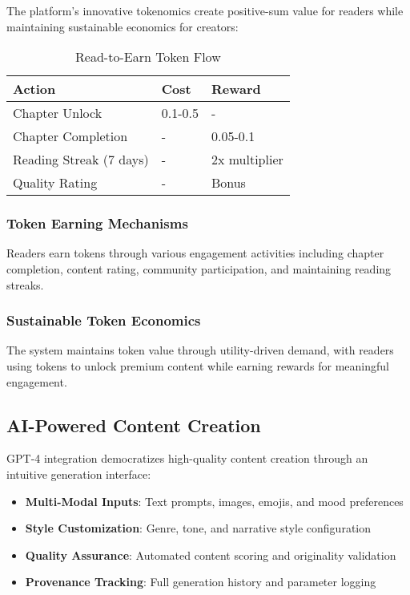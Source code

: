 The platform's innovative tokenomics create positive-sum value for readers while maintaining sustainable economics for creators:

\begin{table}[H]
\centering
\caption{Read-to-Earn Token Flow}
\label{tab:read-to-earn-flow}
\begin{tabular}{@{}lll@{}}
\toprule
\textbf{Action} & \textbf{Cost} & \textbf{Reward} \\
\midrule
Chapter Unlock & 0.1-0.5 \tip{} & - \\
Chapter Completion & - & 0.05-0.1 \tip{} \\
Reading Streak (7 days) & - & 2x multiplier \\
Quality Rating & - & Bonus \tip{} \\
\bottomrule
\end{tabular}
\end{table}

\subsubsection{Token Earning Mechanisms}

Readers earn \tip{} tokens through various engagement activities including chapter completion, content rating, community participation, and maintaining reading streaks.

\subsubsection{Sustainable Token Economics}

The system maintains token value through utility-driven demand, with readers using \tip{} tokens to unlock premium content while earning rewards for meaningful engagement.

\subsection{AI-Powered Content Creation}

GPT-4 integration democratizes high-quality content creation through an intuitive generation interface:

\begin{itemize}
    \item \textbf{Multi-Modal Inputs}: Text prompts, images, emojis, and mood preferences
    \item \textbf{Style Customization}: Genre, tone, and narrative style configuration
    \item \textbf{Quality Assurance}: Automated content scoring and originality validation
    \item \textbf{Provenance Tracking}: Full generation history and parameter logging
\end{itemize}

